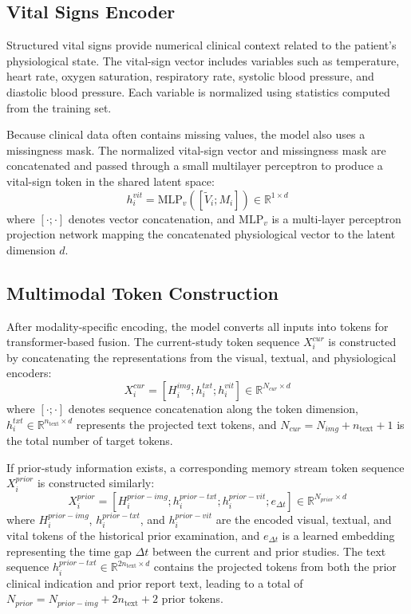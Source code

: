 \subsection{Vital Signs Encoder}
\label{subsec:method_vitals_encoder}

Structured vital signs provide numerical clinical context related to the patient's physiological state. The vital-sign vector includes variables such as temperature, heart rate, oxygen saturation, respiratory rate, systolic blood pressure, and diastolic blood pressure. Each variable is normalized using statistics computed from the training set.

Because clinical data often contains missing values, the model also uses a missingness mask. The normalized vital-sign vector and missingness mask are concatenated and passed through a small multilayer perceptron to produce a vital-sign token in the shared latent space:
\begin{equation}
    h_i^{vit} = \mathrm{MLP}_v([\tilde{V}_i; M_i]) \in \mathbb{R}^{1 \times d}
\end{equation}
where \([\cdot ; \cdot]\) denotes vector concatenation, and \(\mathrm{MLP}_v\) is a multi-layer perceptron projection network mapping the concatenated physiological vector to the latent dimension \(d\).

\subsection{Multimodal Token Construction}
\label{subsec:method_token_construction}

After modality-specific encoding, the model converts all inputs into tokens for transformer-based fusion. The current-study token sequence \(X_i^{cur}\) is constructed by concatenating the representations from the visual, textual, and physiological encoders:
\begin{equation}
    X_i^{cur} = [H_i^{img}; h_i^{txt}; h_i^{vit}] \in \mathbb{R}^{N_{cur} \times d}
\end{equation}
where \([ \cdot ; \cdot ]\) denotes sequence concatenation along the token dimension, \(h_i^{txt} \in \mathbb{R}^{n_{\text{text}} \times d}\) represents the projected text tokens, and \(N_{cur} = N_{img} + n_{\text{text}} + 1\) is the total number of target tokens.

If prior-study information exists, a corresponding memory stream token sequence \(X_i^{prior}\) is constructed similarly:
\begin{equation}
    X_i^{prior} = [H_i^{prior-img}; h_i^{prior-txt}; h_i^{prior-vit}; e_{\Delta t}] \in \mathbb{R}^{N_{prior} \times d}
\end{equation}
where \(H_i^{prior-img}\), \(h_i^{prior-txt}\), and \(h_i^{prior-vit}\) are the encoded visual, textual, and vital tokens of the historical prior examination, and \(e_{\Delta t}\) is a learned embedding representing the time gap \(\Delta t\) between the current and prior studies. The text sequence \(h_i^{prior-txt} \in \mathbb{R}^{2n_{\text{text}} \times d}\) contains the projected tokens from both the prior clinical indication and prior report text, leading to a total of \(N_{prior} = N_{prior-img} + 2n_{\text{text}} + 2\) prior tokens.

